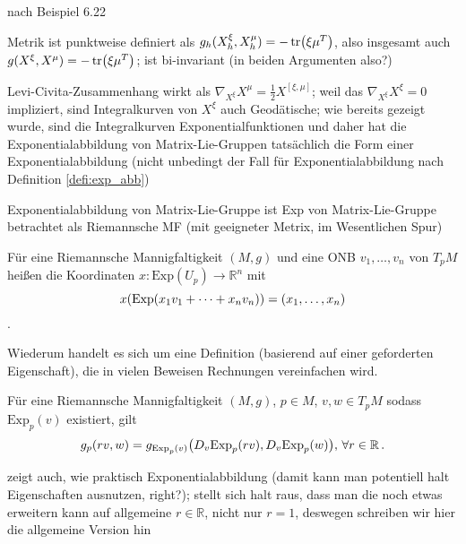 \documentclass[../H_Analysis_main.tex]{subfiles}
\begin{document}
\begin{bsp}
nach Beispiel 6.22

Metrik ist punktweise definiert als $g_h(X^\xi_h, X^\mu_h) = - \tr(\xi \mu^T)$, also insgesamt auch $g(X^\xi, X^\mu) = - \tr(\xi \mu^T)$; ist bi-invariant (in beiden Argumenten also?)

Levi-Civita-Zusammenhang wirkt als $\nabla_{X^\xi} X^\mu = \frac{1}{2} X^{[\xi, \mu]}$; weil das $\nabla_{X^\xi} X^\xi = 0$ impliziert, sind Integralkurven von $X^\xi$ auch Geodätische; wie bereits gezeigt wurde, sind die Integralkurven Exponentialfunktionen und daher hat die Exponentialabbildung von Matrix-Lie-Gruppen tatsächlich die Form einer Exponentialabbildung (nicht unbedingt der Fall für Exponentialabbildung nach Definition \ref{defi:exp_abb})

Exponentialabbildung von Matrix-Lie-Gruppe ist Exp von Matrix-Lie-Gruppe betrachtet als Riemannsche MF (mit geeigneter Metrix, im Wesentlichen Spur)
\end{bsp}


\begin{defi}
Für eine Riemannsche Mannigfaltigkeit $(M, g)$ und eine ONB $v_1, \dots, v_n$ von $T_p M$ heißen die Koordinaten $x: \text{Exp}(U_p) \rightarrow \mathbb{R}^n$ mit
\begin{equation}
x(\text{Exp}(x_1 v_1 + \dots + x_n v_n)) = \qty(x_1, \dots, x_n)
\end{equation}
.
\end{defi}

Wiederum handelt es sich um eine Definition (basierend auf einer geforderten Eigenschaft), die in vielen Beweisen Rechnungen vereinfachen wird.

\begin{lemma}
Für eine Riemannsche Mannigfaltigkeit $(M, g)$, $p \in M$, $v, w \in T_p M$ sodass $\text{Exp}_p (v)$ existiert, gilt
\begin{equation}
g_p(r v, w) = g_{\text{Exp}_p(v)} \qty(D_v \text{Exp}_p (r v), D_v \text{Exp}_p (w)), \, \forall r \in \mathbb{R} \, .
\end{equation}
\end{lemma}
zeigt auch, wie praktisch Exponentialabbildung (damit kann man potentiell halt Eigenschaften ausnutzen, right?); stellt sich halt raus, dass man die noch etwas erweitern kann auf allgemeine $r \in \mathbb{R}$, nicht nur $r = 1$, deswegen schreiben wir hier die allgemeine Version hin
\end{document}

